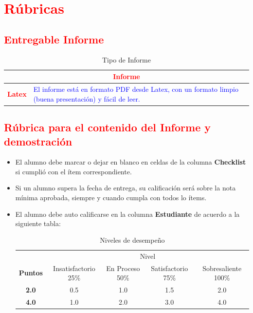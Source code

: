 \documentclass{article}
\begin{document}
\section{\textcolor{red}{Rúbricas}}
	
\subsection{\textcolor{red}{Entregable Informe}}
	\begin{table}[H]
		\caption{Tipo de Informe}
		\setlength{\tabcolsep}{0.5em} %
		{\renewcommand{\arraystretch}{1.5} %
		\begin{tabular}{|p{3cm}|p{12cm}|}
			\hline
			\multicolumn{2}{|c|}{\textbf{\textcolor{red}{Informe}}}  \\
			\hline 
			\textbf{\textcolor{red}{Latex}} & \textcolor{blue}{El informe está en formato PDF desde Latex,  con un formato limpio (buena presentación) y fácil de leer.}   \\ 
			\hline 
		\end{tabular}
	}
	\end{table}
	
\clearpage

 
\subsection{\textcolor{red}{Rúbrica para el contenido del Informe y demostración}}
\begin{itemize}			
	\item El alumno debe marcar o dejar en blanco en celdas de la columna \textbf{Checklist} si cumplió con el ítem correspondiente.
	\item Si un alumno supera la fecha de entrega,  su calificación será sobre la nota mínima aprobada, siempre y cuando cumpla con todos lo ítems.
	\item El alumno debe auto calificarse en la columna \textbf{Estudiante} de acuerdo a la siguiente tabla:
	
    \begin{table}[ht]
    	\caption{Niveles de desempeño}
    	\begin{center}
    		\begin{tabular}{ccccc}
        	\hline
        	& \multicolumn{4}{c}{Nivel}\\
        	\cline{1-5}
        	\textbf{Puntos} & Insatisfactorio 25\%& En Proceso 50\% & Satisfactorio 75\% & Sobresaliente 100\%\\
        	\textbf{2.0}&0.5&1.0&1.5&2.0\\
        	\textbf{4.0}&1.0&2.0&3.0&4.0\\
        	\hline
    		\end{tabular}
    	\end{center}
    \end{table}	
\end{itemize}
\end{document}
